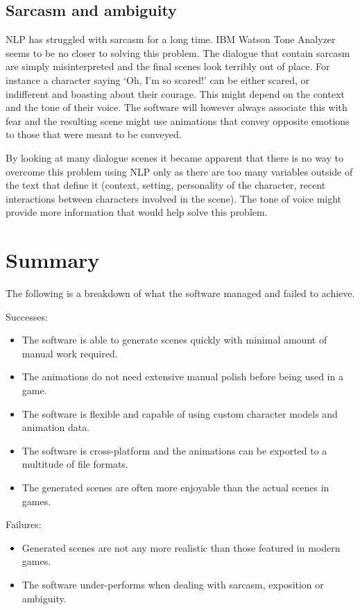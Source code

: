 \subsection{Sarcasm and ambiguity}
NLP has struggled with sarcasm for a long time. IBM Watson Tone Analyzer seems to be no closer to solving this problem. The dialogue that contain sarcasm are simply misinterpreted and the final scenes look terribly out of place. For instance a character saying `Oh, I'm so scared!' can be either scared, or indifferent and boasting about their courage. This might depend on the context and the tone of their voice. The software will however always associate this with fear and the resulting scene might use animations that convey opposite emotions to those that were meant to be conveyed.

By looking at many dialogue scenes it became apparent that there is no way to overcome this problem using NLP only as there are too many variables outside of the text that define it (context, setting, personality of the character, recent interactions between characters involved in the scene). The tone of voice might provide more information that would help solve this problem.


\section{Summary}
The following is a breakdown of what the software managed and failed to achieve.

\noindent Successes:
\begin{itemize}
	\item The software is able to generate scenes quickly with minimal amount of manual work required.
	\item The animations do not need extensive manual polish before being used in a game.
	\item The software is flexible and capable of using custom character models and animation data.
	\item The software is cross-platform and the animations can be exported to a multitude of file formats.
	\item The generated scenes are often more enjoyable than the actual scenes in games.
\end{itemize}

\noindent Failures:
\begin{itemize}
	\item Generated scenes are not any more realistic than those featured in modern games.
	\item The software under-performs when dealing with sarcasm, exposition or ambiguity.
\end{itemize}

